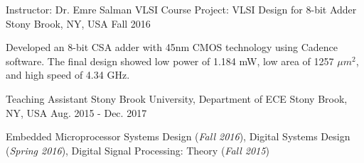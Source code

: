 \begin{cventries}
  \cventry
  {Instructor: Dr. Emre Salman} %
  {VLSI Course Project: VLSI Design for 8-bit Adder} %
  {Stony Brook, NY, USA} %
  {Fall 2016} %
  {
    \begin{cvitems} %
      \item Developed an 8-bit CSA adder with 45nm CMOS technology using Cadence software. The final design showed low power of 1.184 mW, low area of 1257 $\mu m^2$, and high speed of 4.34 GHz.
    \end{cvitems}
  }

  \cventry
    {Teaching Assistant} %
    {Stony Brook University, Department of ECE} %
    {Stony Brook, NY, USA} %
    {Aug. 2015 - Dec. 2017} %
    {
      \begin{cvitems} %
        \item Embedded Microprocessor Systems Design (\textit{Fall 2016}), Digital Systems Design (\textit{Spring 2016}), Digital Signal Processing: Theory (\textit{Fall 2015}) 
      \end{cvitems}
    }

\end{cventries}
